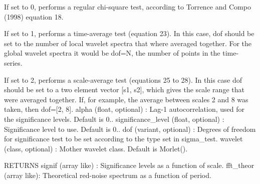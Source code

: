 If set to 0, performs a regular chi-\/square test, according to Torrence and Compo (1998) equation 18.

If set to 1, performs a time-\/average test (equation 23). In this case, dof should be set to the number of local wavelet spectra that where averaged together. For the global wavelet spectra it would be dof=N, the number of points in the time-\/series.

If set to 2, performs a scale-\/average test (equations 25 to 28). In this case dof should be set to a two element vector \mbox{[}s1, s2\mbox{]}, which gives the scale range that were averaged together. If, for example, the average between scales 2 and 8 was taken, then dof=\mbox{[}2, 8\mbox{]}. alpha (float, optional) \-: Lag-\/1 autocorrelation, used for the significance levels. Default is 0.. significance\-\_\-level (float, optional) \-: Significance level to use. Default is 0.. dof (variant, optional) \-: Degrees of freedom for significance test to be set according to the type set in sigma\-\_\-test. wavelet (class, optional) \-: Mother wavelet class. Default is Morlet().

R\-E\-T\-U\-R\-N\-S signif (array like) \-: Significance levels as a function of scale. fft\-\_\-theor (array like)\-: Theoretical red-\/noise spectrum as a function of period. 

